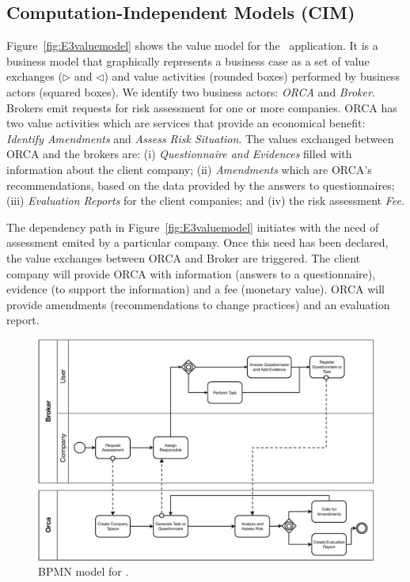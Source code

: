 \subsection{Computation-Independent Models (CIM)}

Figure~\ref{fig:E3valuemodel} shows the value model for the \FlyingPig\ application.
It is a business model that graphically represents a business case as a set of value exchanges ($\triangleright$ and $\triangleleft$) and value activities (rounded boxes) performed by business actors (squared boxes).
We identify two business actors: \textsl{ORCA} and \textsl{Broker}. 
Brokers emit requests for risk assessment for one or more companies. 
ORCA has two value activities which are services that provide an economical benefit:  \textsl{Identify Amendments} and \textsl{Assess Risk Situation}. 
The values exchanged between ORCA and the brokers are: 
(i) \textsl{Questionnaire and Evidences} filled with information about the client company;
(ii) \textsl{Amendments} which are ORCA's recommendations, based on the data provided by the answers to questionnaires; 
(iii) \textsl{Evaluation Reports} for the client companies; 
and 
(iv) the risk assessment \textsl{Fee}.

The dependency path in Figure~\ref{fig:E3valuemodel} initiates with the need of assessment emited by a particular company. 
Once this need has been declared, the value exchanges between ORCA and Broker are triggered. 
The client company will provide ORCA with information (answers to a questionnaire), evidence (to support the information) and a fee (monetary value).
ORCA will provide amendments (recommendations to change practices) and an evaluation report. 

\begin{figure}[t]
\centering
\includegraphics[width=1.0\textwidth]{figs/BPMN_GCP.pdf}
\caption{BPMN model for \FlyingPig.\label{fig:BPMNmodel}}
\end{figure}


